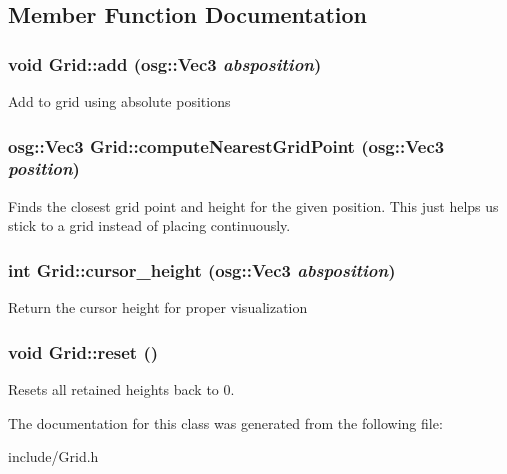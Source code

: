 \subsection{Member Function Documentation}
\hypertarget{class_grid_ae92442413550b0859309d434508dc506}{
\subsubsection[{add}]{\setlength{\rightskip}{0pt plus 5cm}void Grid::add (osg::Vec3 {\em absposition})}}
\label{class_grid_ae92442413550b0859309d434508dc506}
Add to grid using absolute positions \hypertarget{class_grid_a0a159364e4833a4e655017e77ed30ebf}{
\subsubsection[{computeNearestGridPoint}]{\setlength{\rightskip}{0pt plus 5cm}osg::Vec3 Grid::computeNearestGridPoint (osg::Vec3 {\em position})}}
\label{class_grid_a0a159364e4833a4e655017e77ed30ebf}
Finds the closest grid point and height for the given position. This just helps us stick to a grid instead of placing continuously. \hypertarget{class_grid_ab8a99641727faeb81c162f06ac56a915}{
\subsubsection[{cursor\_\-height}]{\setlength{\rightskip}{0pt plus 5cm}int Grid::cursor\_\-height (osg::Vec3 {\em absposition})}}
\label{class_grid_ab8a99641727faeb81c162f06ac56a915}
Return the cursor height for proper visualization \hypertarget{class_grid_a153095310e11b93d349d12f218b5e73e}{
\subsubsection[{reset}]{\setlength{\rightskip}{0pt plus 5cm}void Grid::reset ()}}
\label{class_grid_a153095310e11b93d349d12f218b5e73e}
Resets all retained heights back to 0. 

The documentation for this class was generated from the following file:\begin{DoxyCompactItemize}
\item 
include/Grid.h\end{DoxyCompactItemize}
